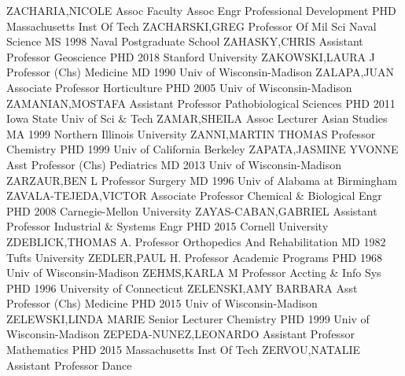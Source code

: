 \documentclass[
]{article}
\begin{document}
ZACHARIA,NICOLE \textbar Assoc Faculty Assoc \textbar Engr Professional
Development \textbar PHD Massachusetts Inst Of Tech \textbar{}
 \textbar ZACHARSKI,GREG \textbar Professor Of Mil Sci
\textbar Naval Science \textbar MS 1998 Naval Postgraduate School
\textbar{}  \textbar ZAHASKY,CHRIS \textbar Assistant
Professor \textbar Geoscience \textbar PHD 2018 Stanford University
\textbar{}  \textbar ZAKOWSKI,LAURA J \textbar Professor
(Chs) \textbar Medicine \textbar MD 1990 Univ of Wisconsin-Madison
\textbar{}  \textbar ZALAPA,JUAN \textbar Associate
Professor \textbar Horticulture \textbar PHD 2005 Univ of
Wisconsin-Madison \textbar{}  \textbar ZAMANIAN,MOSTAFA
\textbar Assistant Professor \textbar Pathobiological Sciences
\textbar PHD 2011 Iowa State Univ of Sci \& Tech \textbar{} 
\textbar ZAMAR,SHEILA \textbar Assoc Lecturer \textbar Asian Studies
\textbar MA 1999 Northern Illinois University \textbar{} 
\textbar ZANNI,MARTIN THOMAS \textbar Professor \textbar Chemistry
\textbar PHD 1999 Univ of California Berkeley \textbar{} 
\textbar ZAPATA,JASMINE YVONNE \textbar Asst Professor (Chs)
\textbar Pediatrics \textbar MD 2013 Univ of Wisconsin-Madison
\textbar{}  \textbar ZARZAUR,BEN L \textbar Professor
\textbar Surgery \textbar MD 1996 Univ of Alabama at Birmingham
\textbar{}  \textbar ZAVALA-TEJEDA,VICTOR \textbar Associate
Professor \textbar Chemical \& Biological Engr \textbar PHD 2008
Carnegie-Mellon University \textbar{} 
\textbar ZAYAS-CABAN,GABRIEL \textbar Assistant Professor
\textbar Industrial \& Systems Engr \textbar PHD 2015 Cornell University
\textbar{}  \textbar ZDEBLICK,THOMAS A. \textbar Professor
\textbar Orthopedics And Rehabilitation \textbar MD 1982 Tufts
University \textbar{}  \textbar ZEDLER,PAUL H.
\textbar Professor \textbar Academic Programs \textbar PHD 1968 Univ of
Wisconsin-Madison \textbar{}  \textbar ZEHMS,KARLA M
\textbar Professor \textbar Accting \& Info Sys \textbar PHD 1996
University of Connecticut \textbar{}  \textbar ZELENSKI,AMY
BARBARA \textbar Asst Professor (Chs) \textbar Medicine \textbar PHD
2015 Univ of Wisconsin-Madison \textbar{} 
\textbar ZELEWSKI,LINDA MARIE \textbar Senior Lecturer
\textbar Chemistry \textbar PHD 1999 Univ of Wisconsin-Madison
\textbar{}  \textbar ZEPEDA-NUNEZ,LEONARDO
\textbar Assistant Professor \textbar Mathematics \textbar PHD 2015
Massachusetts Inst Of Tech \textbar{} 
\textbar ZERVOU,NATALIE \textbar Assistant Professor \textbar Dance
\end{document}
